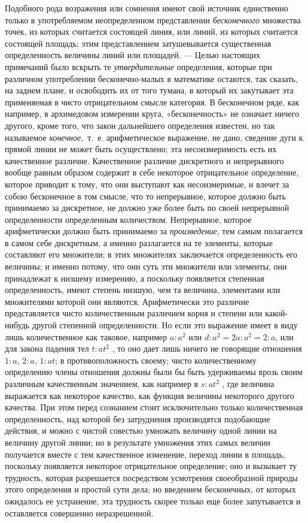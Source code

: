 Подобного рода возражения или сомнения имеют свой источник единственно
только в употребляемом неопределенном представлении
{\em бесконечного} множества точек, из которых
считается состоящей линия, или линий, из которых считается состоящей
площадь; этим представлением затушевывается существенная определенность
величины линий или площадей. — Целью настоящих примечаний было вскрыть те
{\em утвердительные} определения, которые при различном
употреблении бесконечно-малых в математике остаются, так сказать, на заднем
плане, и освободить их от того тумана, в который их закутывает эта
применяемая в чисто отрицательном смысле категория. В бесконечном ряде, как
например, в архимедовом измерении круга, «бесконечность» не означает ничего
другого, кроме того, что закон дальнейшего определения известен, но так
называемое {\em конечное},~т.~е. арифметическое
выражение, не дано, сведение дуги к прямой линии не может быть
осуществлено; эта несоизмеримость есть их качественное различие.
Качественное различие дискретного и непрерывного вообще равным образом
содержит в себе некоторое отрицательное определение, которое приводит к
тому, что они выступают как несоизмеримые, и влечет за собою бесконечное в
том смысле, что то непрерывное, которое должно быть принимаемо за
дискретное, не должно уже более быть по своей непрерывной определенности
определенным количеством. Непрерывное, которое арифметически должно быть
принимаемо за {\em произведение}, тем самым полагается
в самом себе дискретным, а именно разлагается на те элементы, которые
составляют его множители; в этих множителях заключается определенность его
величины; и именно потому, что они суть эти множители или элементы, они
принадлежат к низшему измерению, а поскольку появляется степенная
определенность, имеют степень низшую, чем та величина, элементами или
множителями которой они являются. Арифметически это различие представляется
чисто количественным различием корня и степени или какой-нибудь другой
степенной определенности. Но если это выражение имеет в виду лишь
количественное как таковое, например $a : a^2$ или $d : a^2 = 2a : a^2 = 2 : a$, или для закона падения тел 
$t : at^2$ , то оно дает лишь ничего не говорящие отношения 
$1 : a$, $2:a$, $1 : at$; в противоположность своему; чисто
количественному определению члены отношения должны были бы быть удерживаемы
врозь своим различным качественным значением, как например в 
$s : at^2$ , где величина выражается как некоторое качество,
как функция величины некоторого другого качества. При этом перед сознанием
стоит исключительно только количественная определенность, над которой без
затруднения производятся подобающие действия, и можно с чистой совестью
умножать величину одной линии на величину другой линии; но в результате
умножения этих самых величин получается вместе с тем качественное
изменение, переход линии в площадь, поскольку появляется некоторое
отрицательное определение; оно и вызывает ту трудность, которая разрешается
посредством усмотрения своеобразной природы этого определения и простой
сути дела; но введением бесконечных, от которых ожидалось ее устранение,
эта трудность скорее только еще более запутывается и оставляется совершенно
неразрешенной.
